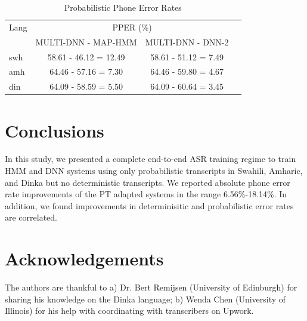 \documentclass[a4paper]{article}
\newcommand{\myvspacesec}{\vspace{-2mm}}
\begin{document}
\begin{table}
\vspace{-3mm}
\centering %
\caption{Probabilistic Phone Error Rates} \label{Tab:PPER}
\vspace{-3mm}
\begin{tabular}{l|c c c}
   \hline
Lang  & \multicolumn{2}{c}{PPER (\%)} \\
          &  \footnotesize{MULTI-DNN - MAP-HMM} & \footnotesize{MULTI-DNN - DNN-2}  \\ \hline
swh      &  58.61 - 46.12 = 12.49 & 58.61 - 51.12 = 7.49  \\
amh      & 64.46 - 57.16 = 7.30   & 64.46 - 59.80 = 4.67  \\
din      & 64.09 - 58.59 = 5.50   & 64.09 - 60.64 = 3.45 \\ \hline
\end{tabular}
\vspace{-7mm}
\end{table}


\myvspacesec
\section{Conclusions} \vspace{-1mm}
In this study, we presented a complete end-to-end ASR training regime to train HMM and DNN systems using only probabilistic transcripts in Swahili, Amharic, and Dinka but no deterministic transcripts. We reported absolute phone error rate improvements of the PT adapted systems in the range 6.56\%-18.14\%. In addition, we found improvements in determinisitic and probabilistic error rates are correlated.

\myvspacesec
\vspace{-2mm}
\section{Acknowledgements} \vspace{-1mm}
The authors are thankful to a) Dr. Bert Remijsen (University of Edinburgh) for sharing his knowledge on the Dinka language; b) Wenda Chen (University of Illinois) for his help with coordinating with transcribers on Upwork.

\end{document}

